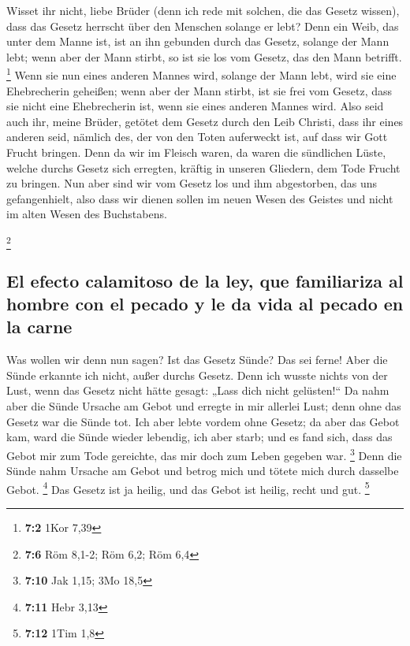  Wisset ihr nicht, liebe Brüder (denn ich rede mit
solchen, die das Gesetz wissen), dass das Gesetz herrscht über den
Menschen solange er lebt?  Denn ein Weib, das unter dem
Manne ist, ist an ihn gebunden durch das Gesetz, solange der Mann lebt;
wenn aber der Mann stirbt, so ist sie los vom Gesetz, das den Mann
betrifft. \footnote{\textbf{7:2} 1Kor 7,39}  Wenn sie nun
eines anderen Mannes wird, solange der Mann lebt, wird sie eine
Ehebrecherin geheißen; wenn aber der Mann stirbt, ist sie frei vom
Gesetz, dass sie nicht eine Ehebrecherin ist, wenn sie eines anderen
Mannes wird.  Also seid auch ihr, meine Brüder, getötet
dem Gesetz durch den Leib Christi, dass ihr eines anderen seid, nämlich
des, der von den Toten auferweckt ist, auf dass wir Gott Frucht bringen.
 Denn da wir im Fleisch waren, da waren die sündlichen
Lüste, welche durchs Gesetz sich erregten, kräftig in unseren Gliedern,
dem Tode Frucht zu bringen.  Nun aber sind wir vom Gesetz
los und ihm abgestorben, das uns gefangenhielt, also dass wir dienen
sollen im neuen Wesen des Geistes und nicht im alten Wesen des
Buchstabens.

\footnote{\textbf{7:6} Röm 8,1-2; Röm 6,2; Röm 6,4}

\hypertarget{el-efecto-calamitoso-de-la-ley-que-familiariza-al-hombre-con-el-pecado-y-le-da-vida-al-pecado-en-la-carne}{%
\subsection{El efecto calamitoso de la ley, que familiariza al hombre
con el pecado y le da vida al pecado en la
carne}\label{el-efecto-calamitoso-de-la-ley-que-familiariza-al-hombre-con-el-pecado-y-le-da-vida-al-pecado-en-la-carne}}

 Was wollen wir denn nun sagen? Ist das Gesetz Sünde? Das
sei ferne! Aber die Sünde erkannte ich nicht, außer durchs Gesetz. Denn
ich wusste nichts von der Lust, wenn das Gesetz nicht hätte gesagt:
„Lass dich nicht gelüsten!{}``  Da nahm aber die Sünde
Ursache am Gebot und erregte in mir allerlei Lust; denn ohne das Gesetz
war die Sünde tot.  Ich aber lebte vordem ohne Gesetz; da
aber das Gebot kam, ward die Sünde wieder lebendig,  ich
aber starb; und es fand sich, dass das Gebot mir zum Tode gereichte, das
mir doch zum Leben gegeben war. \footnote{\textbf{7:10} Jak 1,15; 3Mo
  18,5}  Denn die Sünde nahm Ursache am Gebot und betrog
mich und tötete mich durch dasselbe Gebot. \footnote{\textbf{7:11} Hebr
  3,13}  Das Gesetz ist ja heilig, und das Gebot ist
heilig, recht und gut. \footnote{\textbf{7:12} 1Tim 1,8}


